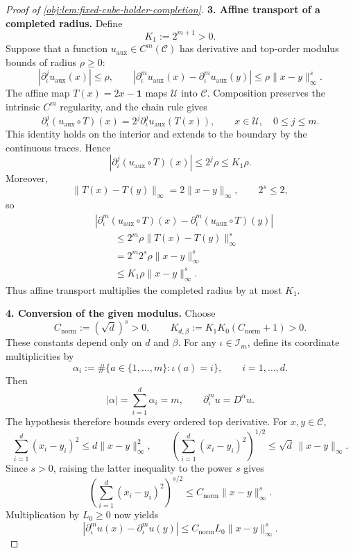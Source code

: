 \documentclass[11pt]{article}
\begin{document}
\begin{proof}[Proof of \cref{obj:lem:fixed-cube-holder-completion}]
\textbf{3. Affine transport of a completed radius.}
Define
\[
K_1:=2^{m+1}>0.
\]
Suppose that a function \(u_{\mathrm{aux}}\in C^m(\mathscr C)\) has derivative and top-order modulus bounds of radius \(\rho\ge0\):
\[
|\partial_\iota^j u_{\mathrm{aux}}(x)|\le\rho,
\qquad
|\partial_\iota^m u_{\mathrm{aux}}(x)
-\partial_\iota^m u_{\mathrm{aux}}(y)|
\le\rho\|x-y\|_\infty^s.
\]
The affine map \(T(x)=2x-\mathbf1\) maps \(\mathscr U\) into \(\mathscr C\). Composition preserves the intrinsic \(C^m\) regularity, and the chain rule gives
\[
\partial_\iota^j(u_{\mathrm{aux}}\circ T)(x)
=
2^j\partial_\iota^j u_{\mathrm{aux}}(T(x)),
\qquad x\in\mathscr U,\quad 0\le j\le m.
\]
This identity holds on the interior and extends to the boundary by the continuous traces. Hence
\[
|\partial_\iota^j(u_{\mathrm{aux}}\circ T)(x)|
\le2^j\rho\le K_1\rho.
\]
Moreover,
\[
\|T(x)-T(y)\|_\infty=2\|x-y\|_\infty,
\qquad 2^s\le2,
\]
so
\[
\begin{aligned}
&|\partial_\iota^m(u_{\mathrm{aux}}\circ T)(x)
-\partial_\iota^m(u_{\mathrm{aux}}\circ T)(y)|\\
&\qquad\le
2^m\rho\|T(x)-T(y)\|_\infty^s\\
&\qquad=
2^m2^s\rho\|x-y\|_\infty^s\\
&\qquad\le
K_1\rho\|x-y\|_\infty^s.
\end{aligned}
\]
Thus affine transport multiplies the completed radius by at most \(K_1\).

\textbf{4. Conversion of the given modulus.}
Choose
\[
C_{\mathrm{norm}}:=(\sqrt d)^s>0,
\qquad
K_{d,\beta}:=K_1K_0(C_{\mathrm{norm}}+1)>0.
\]
These constants depend only on \(d\) and \(\beta\). For any
\(\iota\in\mathscr I_m\), define its coordinate multiplicities by
\[
\alpha_i:=\#\{a\in\{1,\ldots,m\}:\iota(a)=i\},
\qquad i=1,\ldots,d.
\]
Then
\[
|\alpha|=\sum_{i=1}^d\alpha_i=m,
\qquad
\partial_\iota^m u=D^\alpha u.
\]
The hypothesis therefore bounds every ordered top derivative. For \(x,y\in\mathscr C\),
\[
\sum_{i=1}^d(x_i-y_i)^2
\le d\|x-y\|_\infty^2,
\qquad
\left(\sum_{i=1}^d(x_i-y_i)^2\right)^{1/2}
\le\sqrt d\,\|x-y\|_\infty.
\]
Since \(s>0\), raising the latter inequality to the power \(s\) gives
\[
\left(\sum_{i=1}^d(x_i-y_i)^2\right)^{s/2}
\le C_{\mathrm{norm}}\|x-y\|_\infty^s.
\]
Multiplication by \(L_0\ge0\) now yields
\[
|\partial_\iota^m u(x)-\partial_\iota^m u(y)|
\le
C_{\mathrm{norm}}L_0\|x-y\|_\infty^s.
\]


\end{proof}
\end{document}

